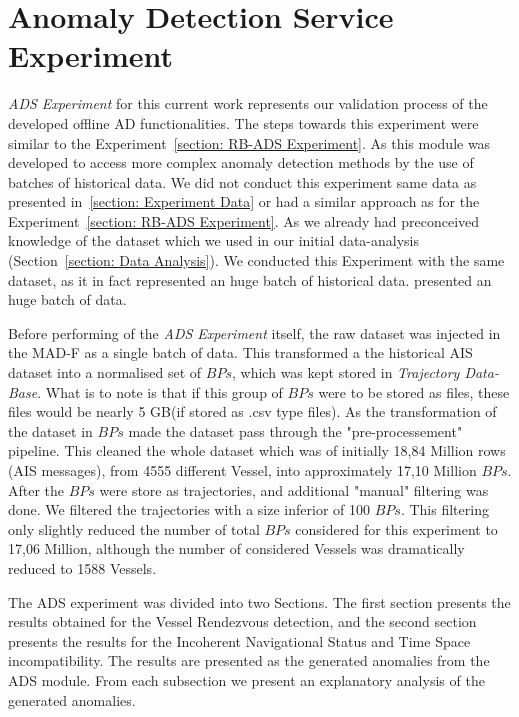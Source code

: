 \section{Anomaly Detection Service Experiment}
\emph{ADS Experiment} for this current work represents our validation process of the developed offline AD functionalities. The steps towards this experiment were similar to the Experiment~\ref{section: RB-ADS Experiment}. As this module was developed to access more complex anomaly detection methods by the use of batches of historical data. We did not conduct this experiment same data as presented in~\ref{section: Experiment Data} or had a similar approach as for the Experiment~\ref{section: RB-ADS Experiment}.
As we already had preconceived knowledge of the dataset which we used in our initial data-analysis (Section~\ref{section: Data Analysis}). We conducted this Experiment with the same dataset, as it in fact represented an huge batch of historical data.
presented an huge batch of data. 

Before performing of the \emph{ADS Experiment} itself, the raw dataset was injected in the MAD-F as a single batch of data. This transformed a the historical AIS dataset into a normalised set of $BPs$, which was kept stored in \emph{Trajectory Data-Base}. What is to note is that if this group of $BPs$ were to be stored as files, these files would be nearly 5 GB(if stored as .csv type files).
As the transformation of the dataset in $BPs$ made the dataset pass through the "pre-processement" pipeline. This cleaned the whole dataset which was of initially 18,84 Million rows (AIS messages), from 4555 different Vessel, into approximately 17,10 Million $BPs$.
After the $BPs$ were store as trajectories, and additional "manual" filtering was done. We filtered the trajectories with a size inferior of 100 $BPs$. This filtering only slightly reduced the number of total $BPs$ considered for this experiment to 17,06 Million, although the number of considered Vessels was dramatically reduced to 1588 Vessels.

The ADS experiment was divided into two Sections. The first section presents the results obtained for the Vessel Rendezvous detection, and the second section presents the results for the Incoherent Navigational Status and Time Space incompatibility. The results are presented as the generated anomalies from the ADS module. From each subsection we present an explanatory analysis of the generated anomalies.  

